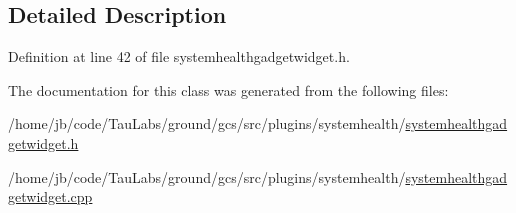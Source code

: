 \subsection{\-Detailed \-Description}


\-Definition at line 42 of file systemhealthgadgetwidget.\-h.



\-The documentation for this class was generated from the following files\-:\begin{DoxyCompactItemize}
\item 
/home/jb/code/\-Tau\-Labs/ground/gcs/src/plugins/systemhealth/\hyperlink{systemhealthgadgetwidget_8h}{systemhealthgadgetwidget.\-h}\item 
/home/jb/code/\-Tau\-Labs/ground/gcs/src/plugins/systemhealth/\hyperlink{systemhealthgadgetwidget_8cpp}{systemhealthgadgetwidget.\-cpp}\end{DoxyCompactItemize}
